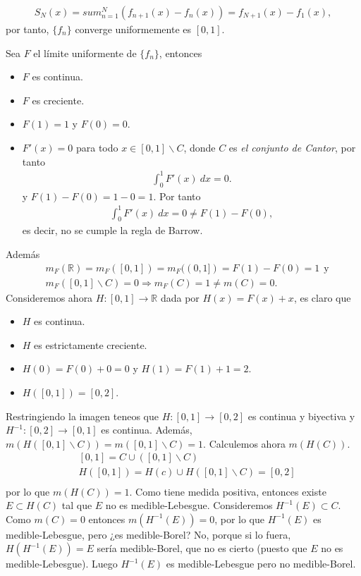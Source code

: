 \begin{ejemplo}
\begin{itemize}
\begin{align*}
                  S_N(x) = sum_{n=1}^{N}{(f_{n+1}(x) - f_n(x))} = f_{N+1}(x) - f_1(x),
              \end{align*}
              por tanto, $\{f_n\}$ converge uniformemente es $[0,1]$.
    \end{itemize}
    Sea $F$ el límite uniformente de $\{f_n\}$, entonces
    \begin{itemize}
        \item $F$ es continua.
        \item $F$ es creciente.
        \item $F(1) = 1$ y $F(0) = 0$.
        \item $F'(x) = 0$ para todo $x \in [0,1] \backslash C$, donde $C$ es \textit{el conjunto de Cantor}, por tanto
              \begin{align*}
                  \int_{0}^{1}{F'(x) \ dx}  = 0.
              \end{align*}
              y $F(1) - F(0) = 1 - 0 = 1$. Por tanto
              \begin{align*}
                  \int_{0}^{1}{F'(x) \ dx}  = 0 \not = F(1) - F(0),
              \end{align*}
              es decir, no se cumple la regla de Barrow.
    \end{itemize}
    Además
    \begin{align*}
         & m_F(\mathbb{R}) = m_F([0,1]) = m_F((0,1]) = F(1) - F(0) = 1 \ \ \text{y} \\
         & m_F([0,1] \backslash C) = 0 \Longrightarrow m_F(C) = 1 \not = m(C) = 0.
    \end{align*}
    Consideremos ahora $H: [0,1] \longrightarrow \mathbb{R}$ dada por $H(x) = F(x) + x$, es claro que
    \begin{itemize}
        \item $H$ es continua.
        \item $H$ es estrictamente creciente.
        \item $H(0) = F(0) + 0 = 0$ y $H(1) = F(1) + 1 = 2$.
        \item $H([0,1]) = [0,2]$.
    \end{itemize}
    Restringiendo la imagen teneos que $H : [0,1] \longrightarrow [0,2]$ es continua y biyectiva y $H^{-1} : [0,2] \longrightarrow [0,1]$ es continua. Además, $m(H([0,1]\backslash C)) = m([0,1]\backslash C) = 1$. Calculemos ahora $m(H(C))$.
    \begin{align*}
         & [0,1] = C \cup ([0,1] \backslash C)                \\
         & H([0,1]) = H(c) \cup H([0,1] \backslash C) = [0,2] \\
    \end{align*}
    por lo que $m(H(C)) = 1$. Como tiene medida positiva, entonces existe $E \subset H(C)$ tal que $E$ no es medible-Lebesgue. Consideremos $H^{-1}(E) \subset C$. Como $m(C) = 0$ entonces $m(H^{-1}(E)) = 0$, por lo que $H^{-1}(E)$ es medible-Lebesgue, pero ¿es medible-Borel? No, porque si lo fuera, $H(H^{-1}(E)) = E$ sería medible-Borel, que no es cierto (puesto que $E$ no es medible-Lebesgue). Luego $H^{-1}(E)$ es medible-Lebesgue pero no medible-Borel.


\end{ejemplo}
